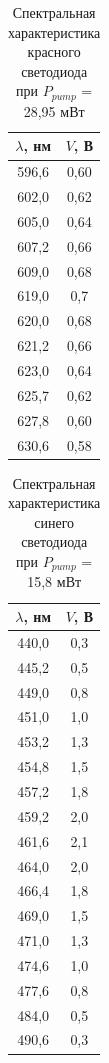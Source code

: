 \documentclass[a4paper,12pt]{report}
\begin{document}
\begin{table}[H]
\begin{tabular}{|c|c|}
\hline
$\lambda$, нм & $V$, В \\ \hline
596,6      & 0,60  \\ \hline
602,0        & 0,62 \\ \hline
605,0        & 0,64 \\ \hline
607,2      & 0,66 \\ \hline
609,0        & 0,68 \\ \hline
619,0        & 0,7  \\ \hline
620,0        & 0,68 \\ \hline
621,2      & 0,66 \\ \hline
623,0        & 0,64 \\ \hline
625,7      & 0,62 \\ \hline
627,8      & 0,60  \\ \hline
630,6      & 0,58 \\ \hline
\end{tabular}
\caption{Спектральная характеристика красного светодиода при $P_{pump}$ = 28,95 мВт}
\label{tab.8}
\end{table}

\begin{table}[H]
\begin{tabular}{|c|c|}
\hline
$\lambda$, нм & $V$, В \\ \hline
440,0        & 0,3  \\ \hline
445,2      & 0,5  \\ \hline
449,0        & 0,8  \\ \hline
451,0        & 1,0    \\ \hline
453,2      & 1,3  \\ \hline
454,8      & 1,5  \\ \hline
457,2      & 1,8  \\ \hline
459,2      & 2,0    \\ \hline
461,6      & 2,1  \\ \hline
464,0        & 2,0    \\ \hline
466,4      & 1,8  \\ \hline
469,0        & 1,5  \\ \hline
471,0        & 1,3  \\ \hline
474,6      & 1,0    \\ \hline
477,6      & 0,8  \\ \hline
484,0        & 0,5  \\ \hline
490,6      & 0,3  \\ \hline
\end{tabular}
\caption{Спектральная характеристика синего светодиода при $P_{pump}$ = 15,8 мВт}
\label{tab.9}
\end{table}
\end{document}
